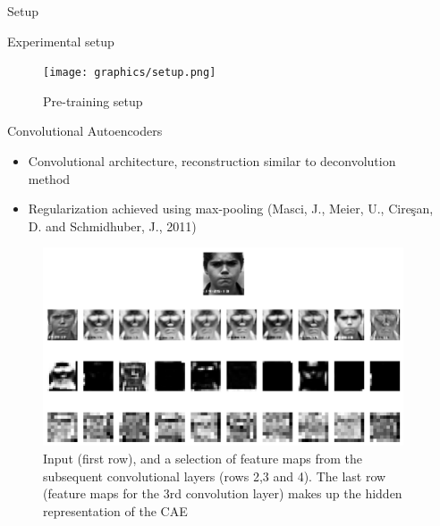 \documentclass[final]{beamer}
\newlength{\sepwid}
\newlength{\onecolwid}
\begin{document}
\begin{frame}[t] %

\begin{columns}[t] %

\begin{column}{\sepwid}\end{column} %

\begin{column}{\onecolwid} %


\begin{alertblock}{Setup}

\begin{block}{Experimental setup}

\begin{figure}
\texttt{[image: graphics/setup.png]}
\caption{Pre-training setup}
\end{figure}

\end{block}

\begin{block}{Convolutional Autoencoders}

\begin{itemize}
	\item Convolutional architecture, reconstruction similar to deconvolution method 
	\item Regularization achieved using max-pooling (Masci, J., Meier, U., Cireşan, D. and Schmidhuber, J., 2011)
\end{itemize}

\begin{figure}

\captionsetup{format=default}

\includegraphics[width=0.8\linewidth]{graphics/feature_map_walkthrough_ckplus.png}
\caption{Input (first row), and a selection of feature maps from the subsequent convolutional layers (rows 2,3 and 4). The last row (feature maps for the 3rd convolution layer) makes up the hidden representation of the CAE}
\end{figure}


\end{block}
\end{alertblock}
\end{column}
\end{columns}
\end{frame}
\end{document}
